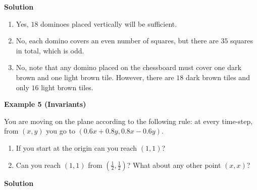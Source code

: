 \documentclass{article}
\begin{document}
    \vspace{1.5mm}
    \textbf{Solution}
    \begin{enumerate}
        \item Yes, $18$ dominoes placed vertically will be sufficient.
        \item No, each domino covers an even number of squares, but there are $35$ squares in total, which is odd.
        \item No, note that any domino placed on the chessboard must cover one dark brown and one light brown tile. However, there are $18$ dark brown tiles and only $16$ light brown tiles.
    \end{enumerate}

    \vspace{1.5mm}
    \textbf{Example 5 (Invariants)}
    
    \vspace{1.5mm}
    You are moving on the plane according to the following rule: at every time-step, from $(x, y)$ you go to $(0.6x + 0.8y, 0.8x - 0.6y)$.
    \begin{enumerate}
        \item If you start at the origin can you reach $(1, 1)$?
        \item Can you reach $(1, 1)$ from $(\frac{1}{2}, \frac{1}{2})$? What about any other point $(x, x)$?
    \end{enumerate}
    \vspace{1.5mm}
    \textbf{Solution}
    
\end{document}
